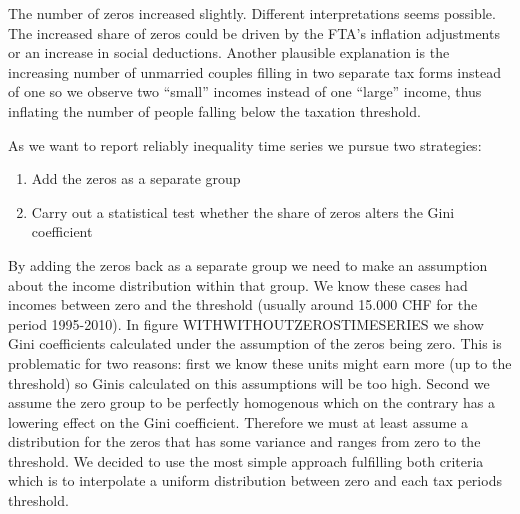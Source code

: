 \documentclass[twoside]{article}\usepackage[]{graphicx}\usepackage[]{color}
\begin{document}
\begin{multicols}{2}
The number of zeros increased slightly. Different interpretations seems possible. The increased share of zeros could be driven by the FTA's inflation adjustments or an increase in social deductions. Another plausible explanation is the increasing number of unmarried couples filling in two separate tax forms instead of one so we observe two ``small'' incomes instead of one ``large'' income, thus inflating the number of people falling below the taxation threshold. 


As we want to report reliably inequality time series we pursue two strategies:

\begin{enumerate}
\item Add the zeros as a separate group
\item Carry out a statistical test whether the share of zeros alters the Gini coefficient
\end{enumerate}

By adding the zeros back as a separate group we need to make an assumption about the income distribution within that group. We know these cases had incomes between zero and the threshold (usually around 15.000 CHF for the period 1995-2010). In figure WITHWITHOUTZEROSTIMESERIES we show Gini coefficients calculated under the assumption of the zeros being zero. This is problematic for two reasons: first we know these units might earn more (up to the threshold) so Ginis calculated on this assumptions will be too high. Second we assume the zero group to be perfectly homogenous which on the contrary has a lowering effect on the Gini coefficient. Therefore we must at least assume a distribution for the zeros that has some variance and ranges from zero to the threshold. We decided to use the most simple approach fulfilling both criteria which is to interpolate a uniform distribution between zero and each tax periods threshold.


\end{multicols}
\end{document}
